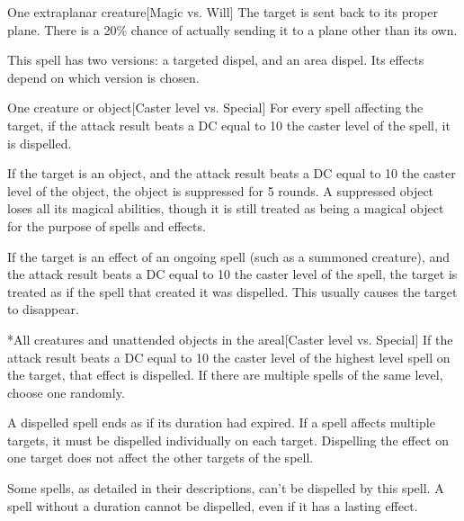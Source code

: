 \spellrng{\rngclose}
\begin{spelltarget}{One extraplanar creature}[Magic vs. Will]
    \spellsuccess The target is sent back to its proper plane. There is a 20\% chance of actually sending it to a plane other than its own.
\end{spelltarget}

\spellrng{\rngmed}
\spellspecial This spell has two versions: a targeted dispel, and an area dispel. Its effects depend on which version is chosen.
\begin{spelltarget}{One creature or object}[Caster level vs. Special]
    \spelleffect For every spell affecting the target, if the attack result beats a DC equal to 10 \add the caster level of the spell, it is dispelled.

    If the target is an object, and the attack result beats a DC equal to 10 \add the caster level of the object, the object is suppressed for 5 rounds. A suppressed object loses all its magical abilities, though it is still treated as being a magical object for the purpose of spells and effects.

    If the target is an effect of an ongoing spell (such as a summoned creature), and the attack result beats a DC equal to 10 \add the caster level of the spell, the target is treated as if the spell that created it was dispelled. This usually causes the target to disappear.
\end{spelltarget}

\spellline
{}
\begin{spelltargets}*{All creatures and unattended objects in the area}l[Caster level vs. Special]
    \spelleffect If the attack result beats a DC equal to 10 \add the caster level of the highest level spell on the target, that effect is dispelled. If there are multiple spells of the same level, choose one randomly.
\end{spelltargets}

\spellnotes A dispelled spell ends as if its duration had expired. If a spell affects multiple targets, it must be dispelled individually on each target. Dispelling the effect on one target does not affect the other targets of the spell.

Some spells, as detailed in their descriptions, can't be dispelled by this spell. A spell without a duration cannot be dispelled, even if it has a lasting effect.

